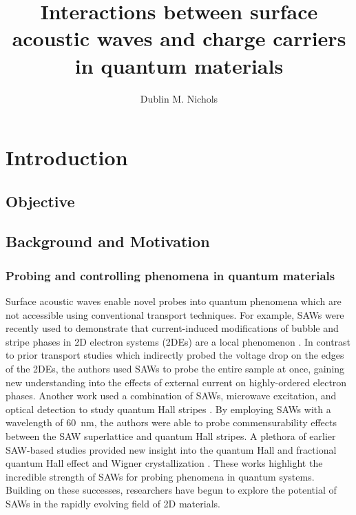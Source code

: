\documentclass[double,12pt,1in]{beavtex}
\title{Interactions between surface acoustic waves and charge carriers in quantum materials}
\author{Dublin M. Nichols}
\begin{document}
\maketitle
\mainmatter


\chapter{Introduction}



\section{Objective}

\newpage
\section{Background and Motivation}
\subsection{Probing and controlling phenomena in quantum materials}

Surface acoustic waves enable novel probes into quantum phenomena which are not accessible using conventional transport techniques. For example, SAWs were recently used to demonstrate that current-induced modifications of bubble and stripe phases in 2D electron systems (2DEs) are a local phenomenon \cite{friess_current_2018}. In contrast to prior transport studies which indirectly probed the voltage drop on the edges of the 2DEs, the authors used SAWs to probe the entire sample at once, gaining new understanding into the effects of external current on highly-ordered electron phases. Another work used a combination of SAWs, microwave excitation, and optical detection to study quantum Hall stripes \cite{kukushkin_collective_2011}. By employing SAWs with a wavelength of \SI{60}{\nano\meter}, the authors were able to probe commensurability effects between the SAW superlattice and quantum Hall stripes. A plethora of earlier SAW-based studies provided new insight into the quantum Hall and fractional quantum Hall effect \cite{wixforth_quantum_1986,esslinger_acoustoelectric_1992,esslinger_ultrasonic_1994,kukushkin_collective_2011,willett_experimental_1993} and Wigner crystallization \cite{paalanen_rf_1992}. These works highlight the incredible strength of SAWs for probing phenomena in quantum systems. Building on these successes, researchers have begun to explore the potential of SAWs in the rapidly evolving field of 2D materials.
\end{document}
